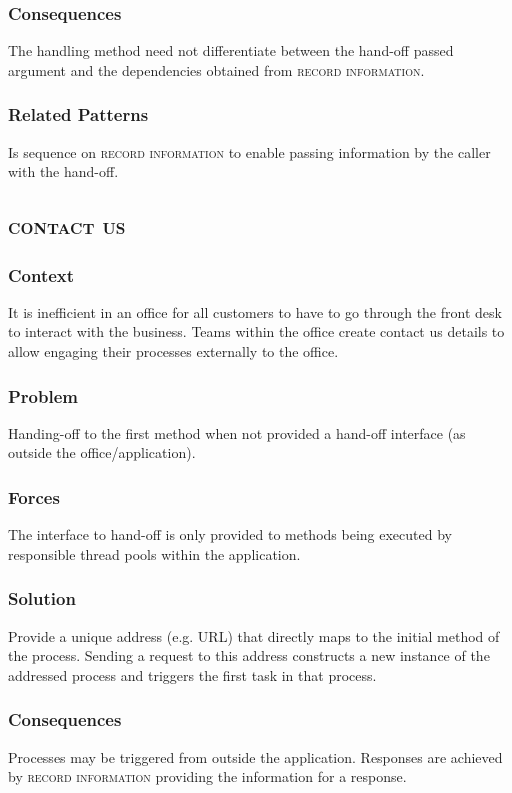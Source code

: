 \documentclass[prodmode]{style/acmlarge}
\begin{document}
\subsubsection*{Consequences} The handling method need not differentiate between
the hand-off passed argument and the dependencies obtained from \textsc{record
information}.

\subsubsection*{Related Patterns} Is sequence on \textsc{record information} to
enable passing information by the caller with the hand-off.



\subsection{\textsc{\textbf{contact us}}}

\subsubsection*{Context} It is inefficient in an office for all customers to
have to go through the front desk to interact with the business.  Teams within
the office create contact us details to allow engaging their processes
externally to the office.

\subsubsection*{Problem} Handing-off to the first method when not provided a
hand-off interface (as outside the office/application).

\subsubsection*{Forces} The interface to hand-off is only provided to methods
being executed by responsible thread pools within the application.

\subsubsection*{Solution} Provide a unique address (e.g. URL) that directly maps
to the initial method of the process.  Sending a request to this address
constructs a new instance of the addressed process and triggers the first task
in that process.

\subsubsection*{Consequences} Processes may be triggered from outside the
application. Responses are achieved by \textsc{record information} providing the
information for a response.
\end{document}
